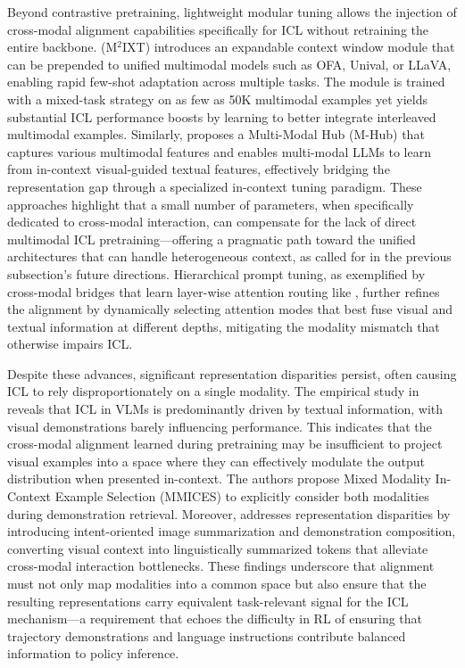 \documentclass[11pt]{article}
\begin{document}
Beyond contrastive pretraining, lightweight modular tuning allows the injection of cross-modal alignment capabilities specifically for ICL without retraining the entire backbone. \cite{ref107} (M\(^2\)IXT) introduces an expandable context window module that can be prepended to unified multimodal models such as OFA, Unival, or LLaVA, enabling rapid few-shot adaptation across multiple tasks. The module is trained with a mixed-task strategy on as few as 50K multimodal examples yet yields substantial ICL performance boosts by learning to better integrate interleaved multimodal examples. Similarly, \cite{ref108} proposes a Multi-Modal Hub (M-Hub) that captures various multimodal features and enables multi-modal LLMs to learn from in-context visual-guided textual features, effectively bridging the representation gap through a specialized in-context tuning paradigm. These approaches highlight that a small number of parameters, when specifically dedicated to cross-modal interaction, can compensate for the lack of direct multimodal ICL pretraining---offering a pragmatic path toward the unified architectures that can handle heterogeneous context, as called for in the previous subsection's future directions. Hierarchical prompt tuning, as exemplified by cross-modal bridges that learn layer-wise attention routing like \cite{ref158}, further refines the alignment by dynamically selecting attention modes that best fuse visual and textual information at different depths, mitigating the modality mismatch that otherwise impairs ICL.

Despite these advances, significant representation disparities persist, often causing ICL to rely disproportionately on a single modality. The empirical study in \cite{ref116} reveals that ICL in VLMs is predominantly driven by textual information, with visual demonstrations barely influencing performance. This indicates that the cross-modal alignment learned during pretraining may be insufficient to project visual examples into a space where they can effectively modulate the output distribution when presented in-context. The authors propose Mixed Modality In-Context Example Selection (MMICES) to explicitly consider both modalities during demonstration retrieval. Moreover, \cite{ref159} addresses representation disparities by introducing intent-oriented image summarization and demonstration composition, converting visual context into linguistically summarized tokens that alleviate cross-modal interaction bottlenecks. These findings underscore that alignment must not only map modalities into a common space but also ensure that the resulting representations carry equivalent task-relevant signal for the ICL mechanism---a requirement that echoes the difficulty in RL of ensuring that trajectory demonstrations and language instructions contribute balanced information to policy inference.
\end{document}
